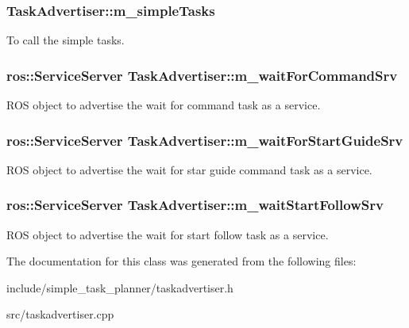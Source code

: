 \subsubsection[{\texorpdfstring{m\+\_\+simple\+Tasks}{m_simpleTasks}}]{ Task\+Advertiser\+::m\+\_\+simple\+Tasks\hspace{0.3cm}{\ttfamily [private]}}\hypertarget{class_task_advertiser_acb092dd73221cb9c470e322e87530933}{}\label{class_task_advertiser_acb092dd73221cb9c470e322e87530933}
To call the simple tasks. 
\subsubsection[{\texorpdfstring{m\+\_\+wait\+For\+Command\+Srv}{m_waitForCommandSrv}}]{\setlength{\rightskip}{0pt plus 5cm}ros\+::\+Service\+Server Task\+Advertiser\+::m\+\_\+wait\+For\+Command\+Srv\hspace{0.3cm}{\ttfamily [private]}}\hypertarget{class_task_advertiser_a57822e31555f279e363c19555ff01683}{}\label{class_task_advertiser_a57822e31555f279e363c19555ff01683}
R\+OS object to advertise the wait for command task as a service. 
\subsubsection[{\texorpdfstring{m\+\_\+wait\+For\+Start\+Guide\+Srv}{m_waitForStartGuideSrv}}]{\setlength{\rightskip}{0pt plus 5cm}ros\+::\+Service\+Server Task\+Advertiser\+::m\+\_\+wait\+For\+Start\+Guide\+Srv\hspace{0.3cm}{\ttfamily [private]}}\hypertarget{class_task_advertiser_aa3dc53cedc6cdd30d2aa2fa26cd998c4}{}\label{class_task_advertiser_aa3dc53cedc6cdd30d2aa2fa26cd998c4}
R\+OS object to advertise the wait for star guide command task as a service. 
\subsubsection[{\texorpdfstring{m\+\_\+wait\+Start\+Follow\+Srv}{m_waitStartFollowSrv}}]{\setlength{\rightskip}{0pt plus 5cm}ros\+::\+Service\+Server Task\+Advertiser\+::m\+\_\+wait\+Start\+Follow\+Srv\hspace{0.3cm}{\ttfamily [private]}}\hypertarget{class_task_advertiser_a4d28e93a047d967b4a632a61ba94f314}{}\label{class_task_advertiser_a4d28e93a047d967b4a632a61ba94f314}
R\+OS object to advertise the wait for start follow task as a service. 

The documentation for this class was generated from the following files\+:\begin{DoxyCompactItemize}
\item 
include/simple\+\_\+task\+\_\+planner/taskadvertiser.\+h\item 
src/taskadvertiser.\+cpp\end{DoxyCompactItemize}
